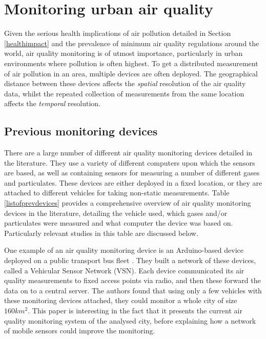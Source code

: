 \documentclass[11pt]{report}
\begin{document}

    
\section{Monitoring urban air quality}

Given the serious health implications of air pollution detailed in Section \ref{healthimpact} and the prevalence of minimum air quality regulations around the world, air quality monitoring is of utmost importance, particularly in urban environments where pollution is often highest. To get a distributed measurement of air pollution in an area, multiple devices are often deployed. The geographical distance between these devices affects the \textit{spatial} resolution of the air quality data, whilst the repeated collection of measurements from the same location affects the \textit{temporal} resolution.

\subsection{Previous monitoring devices}

There are a large number of different air quality monitoring devices detailed in the literature. They use a variety of different computers upon which the sensors are based, as well as containing sensors for measuring a number of different gases and particulates. These devices are either deployed in a fixed location, or they are attached to different vehicles for taking non-static measurements. Table \ref{listofprevdevices} provides a comprehensive overview of air quality monitoring devices in the literature, detailing the vehicle used, which gases and/or particulates were measured and what computer the device was based on. Particularly relevant studies in this table are discussed below.

One example of an air quality monitoring device is an Arduino-based device deployed on a public transport bus fleet \citep{2014busairqualityVSN}. They built a network of these devices, called a Vehicular Sensor Network (VSN). Each device communicated its air quality measurements to fixed access points via radio, and then these forward the data on to a central server. The authors found that using only a few vehicles with these monitoring devices attached, they could monitor a whole city of size \(160km^2\). This paper is interesting in the fact that it presents the current air quality monitoring system of the analysed city, before explaining how a network of mobile sensors could improve the monitoring. 
\end{document}
